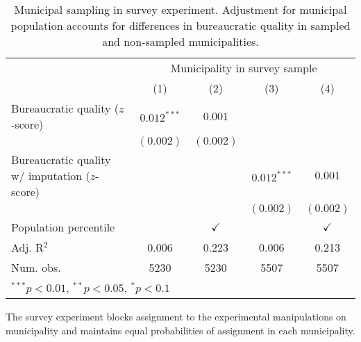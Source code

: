 \documentclass[11pt,english]{article}
\begin{document}
\begin{table}
\begin{center}
\begin{tabular}{l c c c c }
\hline
&\multicolumn{4}{c}{Municipality in survey sample}\\
 & (1)& (2) & (3) & (4) \\
\hline
Bureaucratic quality ($z$-score)         & $0.012^{***}$ & $0.001$   &               &           \\
                 & $(0.002)$     & $(0.002)$ &               &           \\
Bureaucratic quality w/ imputation ($z$-score) &               &           & $0.012^{***}$ & $0.001$   \\
                 &               &           & $(0.002)$     & $(0.002)$ \\

\hline
Population percentile & & $\checkmark$ & & $\checkmark$ \\
Adj. R$^2$       & 0.006         & 0.223     & 0.006         & 0.213     \\
Num. obs.        & 5230          & 5230      & 5507          & 5507      \\
\hline
\multicolumn{5}{l}{\scriptsize{$^{***}p<0.01$, $^{**}p<0.05$, $^*p<0.1$}}
\end{tabular}
\caption{Municipal sampling in survey experiment. Adjustment for municipal population accounts for differences in bureaucratic quality in sampled and non-sampled municipalities.}
\label{tab:survey_sampling}
\end{center}
\end{table}
The survey experiment blocks assignment to the experimental manipulations on municipality and maintains equal probabilities of assignment in each municipality. 
\end{document}

